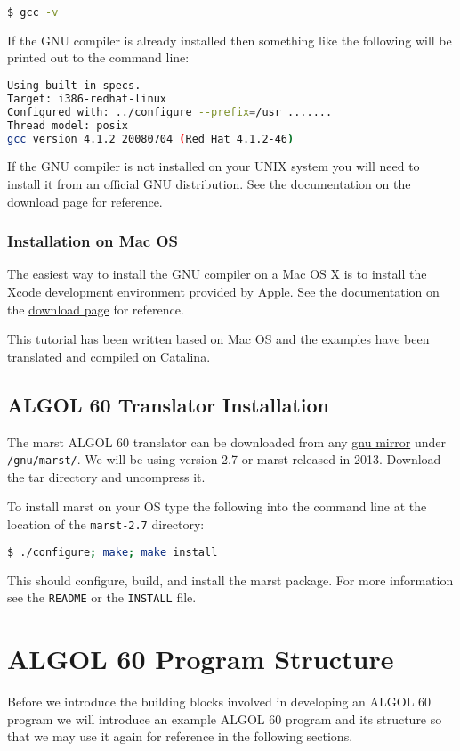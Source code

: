 \documentclass{article}
\begin{document}
\begin{lstlisting}[language=bash]
$ gcc -v
\end{lstlisting}

If the GNU compiler is already installed then something like the following will be printed out to the command line:

\begin{lstlisting}[language=bash]
Using built-in specs. 
Target: i386-redhat-linux 
Configured with: ../configure --prefix=/usr ....... 
Thread model: posix 
gcc version 4.1.2 20080704 (Red Hat 4.1.2-46)
\end{lstlisting}

If the GNU compiler is not installed on your UNIX system you will need to install it from an official GNU distribution. See the documentation on the \href{http://gcc.gnu.org/install/}{download page} for reference.

\subsubsection{Installation on Mac OS}
The easiest way to install the GNU compiler on a Mac OS X is to install the Xcode development environment provided by Apple. See the documentation on the \href{https://developer.apple.com/xcode/}{download page} for reference.

This tutorial has been written based on Mac OS and the examples have been translated and compiled on Catalina.

\subsection{ALGOL 60 Translator Installation}
The marst ALGOL 60 translator can be downloaded from any \href{https://www.gnu.org/prep/ftp.html}{gnu mirror} under \texttt{/gnu/marst/}. We will be using version 2.7 or marst released in 2013. Download the tar directory and uncompress it.

To install marst on your OS type the following into the command line at the location of the \texttt{marst-2.7} directory:

\begin{lstlisting}[language=bash]
$ ./configure; make; make install
\end{lstlisting}

This should configure, build, and install the marst package. For more information see the \texttt{README} or the \texttt{INSTALL} file.

\section{ALGOL 60 Program Structure}
Before we introduce the building blocks involved in developing an ALGOL 60 program we will introduce an example ALGOL 60 program and its structure so that we may use it again for reference in the following sections.
\end{document}
